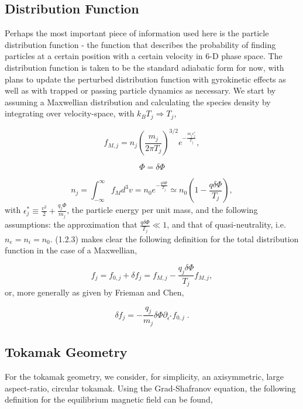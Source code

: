 \documentclass[12pt]{article}
\numberwithin{equation}{subsection}
\begin{document}
\subsection{Distribution Function}
   \quad Perhaps the most important piece of information used here is the particle distribution function - the function that describes the
probability of finding particles at a certain position with a certain velocity in 6-D phase space. The distribution function is taken to be
the standard adiabatic form for now, with plans to update the perturbed distribution function with gyrokinetic effects as well as with trapped
or passing particle dynamics as necessary. We start by assuming a Maxwellian distribution and calculating the species density by integrating over
velocity-space, with $k_B T_j \Rightarrow T_j$,
   
   \begin{equation}
      f_{M,j} = n_j\left(\frac{m_j}{2\pi T_j}\right)^{3/2}e^{-\frac{m_j \epsilon^*_j}{T_j}},
   \end{equation}
   
   \begin{equation}
      \Phi = \delta\Phi
   \end{equation}
   
   \begin{equation}
      n_j = \int_{-\infty}^{\infty}f_M d^{3}v = n_0e^{-\frac{q\delta\Phi}{T_j}} \simeq n_0(1-\frac{q\delta\Phi}{T_j}),
   \end{equation}
with $\epsilon^*_j \equiv \frac{v^2}{2} + \frac{q_j\Phi}{m_j}$, the particle energy per unit mass, and the following assumptions:
the approximation that $\frac{q\delta\Phi}{T_j} \ll 1$, and that of quasi-neutrality, i.e. $n_e = n_i = n_0$. (1.2.3) makes
clear the following definition for the total distribution function in the case of a Maxwellian,

   \begin{equation}
      f_j = f_{0,j} + \delta f_j = f_{M,j} - \frac{q_j\delta\Phi}{T_j}f_{M,j},
   \end{equation}
or, more generally as given by Frieman and Chen\cite{FriemanChen},

   \begin{equation}
      \delta f_j = -\frac{q_j}{m_j}\delta\Phi\partial_{\epsilon^*}f_{0,j}\;.
   \end{equation}

\subsection{Tokamak Geometry}
   \quad For the tokamak geometry, we consider, for simplicity, an axisymmetric, large aspect-ratio, circular tokamak.
Using the Grad-Shafranov equation, the following definition for the equilibrium magnetic field can be found,
\end{document}
